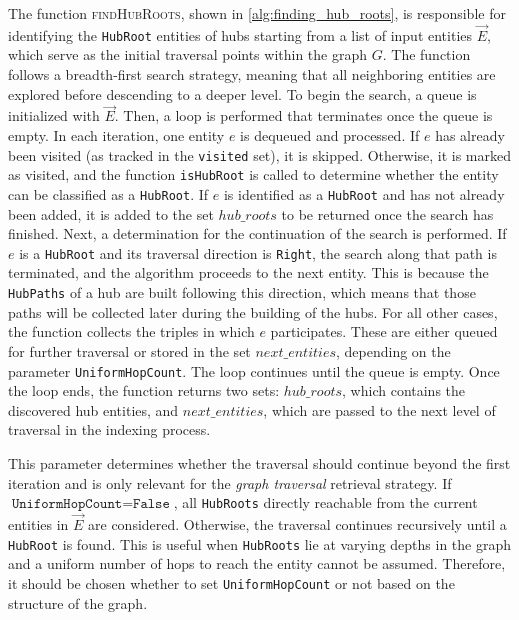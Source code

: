 The function \textsc{findHubRoots}, shown in \autoref{alg:finding_hub_roots}, is responsible for identifying the \texttt{HubRoot} entities of hubs starting from a list of input entities \(\vec{E}\), which serve as the initial traversal points within the graph \(G\). The function follows a breadth-first search strategy, meaning that all neighboring entities are explored before descending to a deeper level. To begin the search, a queue is initialized with \(\vec{E}\). Then, a loop is performed that terminates once the queue is empty. In each iteration, one entity \(e\) is dequeued and processed. If \(e\) has already been visited (as tracked in the \texttt{visited} set), it is skipped. Otherwise, it is marked as visited, and the function \texttt{isHubRoot} is called to determine whether the entity can be classified as a \texttt{HubRoot}. If \(e\) is identified as a \texttt{HubRoot} and has not already been added, it is added to the set \(hub\_roots\) to be returned once the search has finished. Next, a determination for the continuation of the search is performed. If \(e\) is a \texttt{HubRoot} and its traversal direction is \texttt{Right}, the search along that path is terminated, and the algorithm proceeds to the next entity. This is because the \texttt{HubPaths} of a hub are built following this direction, which means that those paths will be collected later during the building of the hubs. For all other cases, the function collects the triples in which \(e\) participates. These are either queued for further traversal or stored in the set \(next\_entities\), depending on the parameter \texttt{UniformHopCount}. The loop continues until the queue is empty. Once the loop ends, the function returns two sets: \(hub\_roots\), which contains the discovered hub entities, and \(next\_entities\), which are passed to the next level of traversal in the indexing process.

\begin{tcolorbox}[title=Parameter: \texttt{UniformHopCount}]
This parameter determines whether the traversal should continue beyond the first iteration and is only relevant for the \emph{graph traversal} retrieval strategy. If \(\texttt{UniformHopCount} = \texttt{False}\), all \texttt{HubRoots} directly reachable from the current entities in \(\vec{E}\) are considered. Otherwise, the traversal continues recursively until a \texttt{HubRoot} is found. This is useful when \texttt{HubRoots} lie at varying depths in the graph and a uniform number of hops to reach the entity cannot be assumed. Therefore, it should be chosen whether to set \texttt{UniformHopCount} or not based on the structure of the graph.
\end{tcolorbox}

